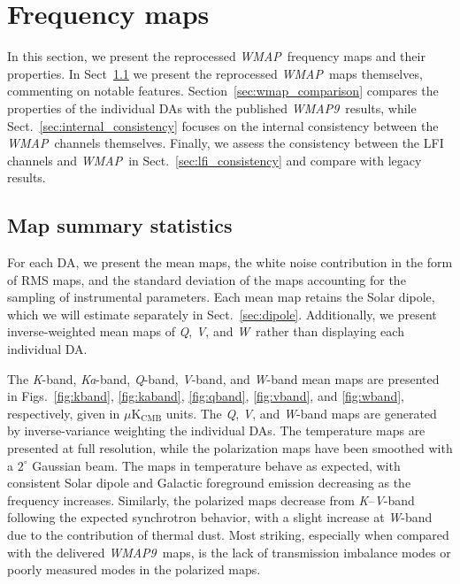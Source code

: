 \documentclass[twocolumn]{../../common/aa}
\def\WMAP{\emph{WMAP}}
\def\WMAPnine{\emph{WMAP9}}
\newcommand{\K}[0]{\textit K}
\newcommand{\Ka}[0]{\textit{Ka}}
\newcommand{\Q}[0]{\textit Q}
\newcommand{\V}[0]{\textit V}
\newcommand{\W}[0]{\textit W}
\begin{document}




\section{Frequency maps}
\label{sec:maps}

In this section, we present the reprocessed \WMAP\ frequency maps and their properties. In Sect~\ref{ssec:means} we present the reprocessed \WMAP\ maps themselves, commenting on notable features. Section~\ref{sec:wmap_comparison} compares the properties of the individual DAs with the published \WMAPnine\ results, while Sect.~\ref{sec:internal_consistency} focuses on the internal consistency between the \WMAP\ channels themselves. Finally, we assess the consistency between the LFI channels and \WMAP\ in Sect.~\ref{sec:lfi_consistency} and compare with legacy results.



\subsection{Map summary statistics}
\label{ssec:means}

For each DA, we present the mean maps, the white noise contribution in the form of RMS maps, and the standard deviation of the maps accounting for the sampling of instrumental parameters. Each mean map retains the Solar dipole, which we will estimate separately in Sect.~\ref{sec:dipole}. Additionally, we present inverse-weighted mean maps of \Q, \V, and \W\ rather than displaying each individual DA.

The \K-band, \Ka-band, \Q-band, \V-band, and \W-band mean maps are presented in Figs.~\ref{fig:kband}, \ref{fig:kaband}, \ref{fig:qband}, \ref{fig:vband}, and \ref{fig:wband}, respectively, given in $\mu\mathrm{K_{CMB}}$ units. 
The \Q, \V, and \W-band maps are generated by inverse-variance weighting the individual DAs.
The temperature maps are presented at full resolution, while the polarization maps have been smoothed with a $2^\circ$ Gaussian beam. The maps in temperature behave as expected, with consistent Solar dipole and Galactic foreground emission decreasing as the frequency increases. Similarly, the polarized maps decrease from \K--\V-band following the expected synchrotron behavior, with a slight increase at \W-band due to the contribution of thermal dust. Most striking, especially when compared with the delivered \WMAPnine\ maps, is the lack of transmission imbalance modes or poorly measured modes in the polarized maps.
\end{document}

